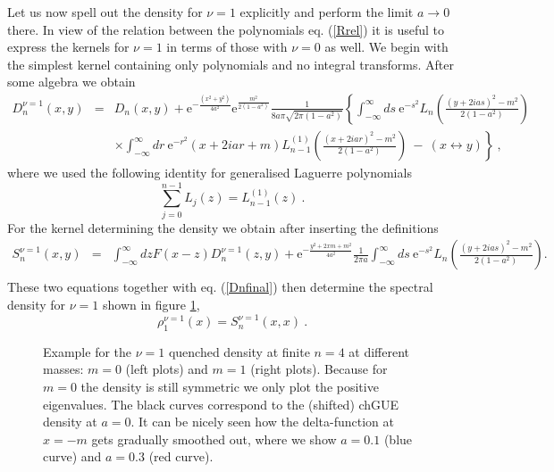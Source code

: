 \documentclass[11pt]{article}
\newcommand{\be}{\begin{equation}}
\newcommand{\ee}{\end{equation}}
\newcommand{\bea}{\begin{eqnarray}}
\newcommand{\eea}{\end{eqnarray}}
\newcommand{\nn}{\nonumber}
\newcommand{\e}{\mbox{e}}
\begin{document}
Let us now spell out the density for $\nu=1$ explicitly and perform
the limit $a\to0$ there. In view of the relation between the
polynomials eq. (\ref{Rrel}) it is useful to express the kernels for
$\nu=1$ in terms of those with $\nu=0$ as well. We begin with the
simplest kernel containing only polynomials and no integral transforms. After
some algebra we obtain
\bea
D^{\nu=1}_n(x,y) & = & D_n(x,y)+\e^{-\frac{(x^2+y^2)}{4a^2}}
\e^{\frac{m^2}{2(1-a^2)}}\frac{1}{8a\pi\sqrt{2\pi(1-a^2)}} 
\left\{
\int_{-\infty}^\infty ds\ \e^{-s^2}
L_n\left(\frac{(y+2ias)^2-m^2}{2(1-a^2)}\right)
\right.
\nn\\
&&\times
\left.
\int_{-\infty}^\infty dr\ \e^{-r^2}(x+2iar+m)
L^{(1)}_{n-1}\left(\frac{(x+2iar)^2-m^2}{2(1-a^2)}\right)
\ -\ (x\leftrightarrow y)
\right\}\ ,
\label{Dnu1}
\eea
where we used the following identity for generalised Laguerre
polynomials \cite{Grad} 
\be
\sum_{j=0}^{n-1}L_j(z)=L^{(1)}_{n-1}(z)\ .
\ee
For the kernel determining the density we obtain after inserting the
definitions
\bea
S^{\nu=1}_n(x,y) & = & \int_{-\infty}^\infty dz F(x-z)D^{\nu=1}_n(z,y)
+ \e^{-\frac{y^2+2xm+m^2}{4a^2}} \frac{1}{2\pi a}
\int_{-\infty}^\infty ds\
\e^{-s^2}L_n\left(\frac{(y+2ias)^2-m^2}{2(1-a^2)}\right).
\nn\\
\label{Snu1}
\eea
These two equations together with eq. (\ref{Dnfinal}) then determine
the spectral density for $\nu=1$ shown in figure \ref{rho1n4nu1},
\be
\rho_1^{\nu=1}(x)=S^{\nu=1}_n(x,x)\ .
\ee
\begin{figure}[-h]
\centerline{
}
\caption{Example for the $\nu=1$ quenched
density at finite $n=4$ at different masses: $m=0$ (left plots)
and $m=1$ (right plots). Because for $m=0$ the density is still
symmetric we only plot the positive eigenvalues. 
The black curves correspond to the (shifted) chGUE density
at $a=0$. It can be nicely seen how the delta-function at $x=-m$ gets
gradually smoothed out, where we show $a=0.1$ (blue curve) and
$a=0.3$ (red curve).
}
\label{rho1n4nu1}
\end{figure}
\end{document}
